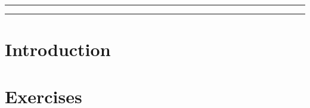 \documentclass[11pt]{cselabheader}
\title{\thetitle}
\author{\theauthor}
\date{NMT Department of Computer Science and Engineering}
\begin{document}
\maketitle
\hrule


\vspace{1em}

\hrule
\newpage

\section*{Introduction}

\tableofcontents

\newpage
{}


\newpage
\section{Exercises}\label{exercises}

\printindex


\end{document}
